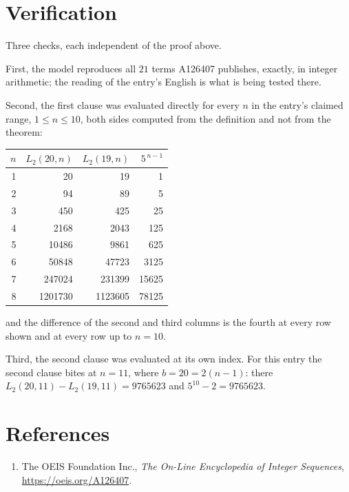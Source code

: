 \documentclass[11pt,a4paper]{article}
\theoremstyle{plain}
\theoremstyle{definition}
\begin{document}
\section{Verification}

Three checks, each independent of the proof above.

First, the model reproduces all $21$ terms A126407 publishes, exactly, in integer
arithmetic; the reading of the entry's English is what is being tested there.

Second, the first clause was evaluated directly for every $n$ in the entry's claimed range,
$1\le n\le10$, both sides computed from the definition and not from the theorem:

\begin{center}
\begin{tabular}{rrrr}
$n$ & $L_{2}(20,n)$ & $L_{2}(19,n)$ & $5^{\,n-1}$ \\ \hline
1 & 20 & 19 & 1 \\
2 & 94 & 89 & 5 \\
3 & 450 & 425 & 25 \\
4 & 2168 & 2043 & 125 \\
5 & 10486 & 9861 & 625 \\
6 & 50848 & 47723 & 3125 \\
7 & 247024 & 231399 & 15625 \\
8 & 1201730 & 1123605 & 78125 \\
\end{tabular}
\end{center}

\noindent and the difference of the second and third columns is the fourth at every row shown
and at every row up to $n=10$.

Third, the second clause was evaluated at its own index. For this entry the second clause bites at $n=11$, where $b=20=2(n-1)$: there $L_{2}(20,11)-L_{2}(19,11)=9765623$ and $5^{10}-2=9765623$.

\section*{References}
\begin{enumerate}
\item The OEIS Foundation Inc., \emph{The On-Line Encyclopedia of Integer Sequences},
\url{https://oeis.org/A126407}.
\end{enumerate}
\end{document}
